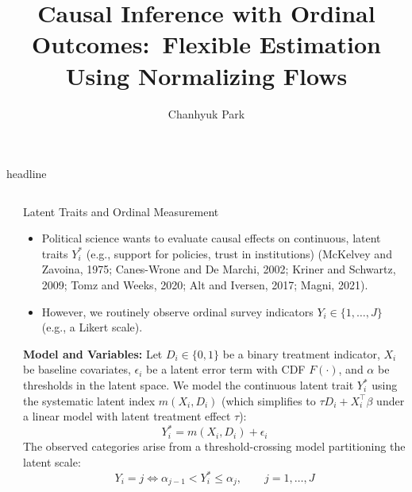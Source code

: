 \documentclass[final]{beamer}
\title{Causal Inference with Ordinal Outcomes:\ Flexible Estimation Using Normalizing Flows}
\author{Chanhyuk Park}
\institute{Washington University in St. Louis}
\newlength{\sepwidth}
\newlength{\colwidth}
\newcommand{\separatorcolumn}{\begin{column}{\sepwidth}\end{column}}
\begin{document}
\begin{frame}[t]

\begin{beamercolorbox}[wd=\paperwidth,sep=0.7cm,leftskip=1.4cm,rightskip=1.4cm]{headline}
  \centering
  \vspace{1cm}\par\inserttitle\par\vspace{0.18cm}
  \insertauthor\par\vspace{0.03cm}
  \insertinstitute\vspace{0.25cm}
\end{beamercolorbox}

\vspace{0.42cm}
\begin{columns}[t,totalwidth=0.995\paperwidth]
\separatorcolumn

\begin{column}{\colwidth}

\begin{block}{Latent Traits and Ordinal Measurement}
\justifying
\begin{itemize}
  \item Political science wants to evaluate causal effects on continuous, latent traits $Y_i^*$ (e.g., support for policies, trust in institutions) {\footnotesize (McKelvey and Zavoina, 1975; Canes-Wrone and De Marchi, 2002; Kriner and Schwartz, 2009; Tomz and Weeks, 2020; Alt and Iversen, 2017; Magni, 2021)}.
  \item However, we routinely observe ordinal survey indicators $Y_i \in \{1, \dots, J\}$ (e.g., a Likert scale).
\end{itemize}

\vspace{0.3cm}
\textbf{Model and Variables:}
Let $D_i \in \{0, 1\}$ be a binary treatment indicator, $X_i$ be baseline covariates, $\epsilon_i$ be a latent error term with CDF $F(\cdot)$, and $\alpha$ be thresholds in the latent space. We model the continuous latent trait $Y_i^*$ using the systematic latent index $m(X_i, D_i)$ (which simplifies to $\tau D_i + X_i^\top \beta$ under a linear model with latent treatment effect $\tau$):
\[
Y_i^* = m(X_i, D_i) + \epsilon_i
\]
The observed categories arise from a threshold-crossing model partitioning the latent scale:
\[
Y_i=j \iff \alpha_{j-1}<Y_i^*\le \alpha_j, \qquad j=1,\dots,J
\]


\end{block}
\end{column}
\end{columns}
\end{frame}
\end{document}
